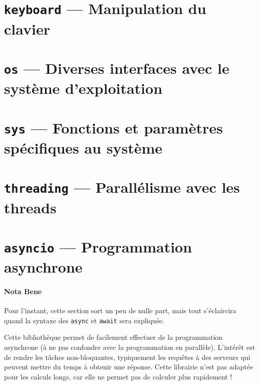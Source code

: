 \documentclass[a4paper, 10pt]{article}
\begin{document}
\section[{\footnotesize\texttt{keyboard}} --- Manipulation du clavier]{{\normalfont\bfseries\large\texttt{keyboard}} --- Manipulation du clavier}

\section[{\footnotesize\texttt{os}} --- Diverses interfaces avec le système d'exploitation]{{\normalfont\bfseries\large\texttt{os}} --- Diverses interfaces avec le système d'exploitation}

\section[{\footnotesize\texttt{sys}} --- Fonctions et paramètres spécifiques au système]{{\normalfont\bfseries\large\texttt{sys}} --- Fonctions et paramètres spécifiques au système}

\section[{\footnotesize\texttt{threading}} --- Parallélisme avec les threads]{{\normalfont\bfseries\large\texttt{threading}} --- Parallélisme avec les threads}

\section[{\footnotesize\texttt{asyncio}} --- Programmation asynchrone]{{\normalfont\bfseries\large\texttt{asyncio}} --- Programmation asynchrone}

\paragraph{Nota Bene} Pour l'instant, cette section sort un peu de nulle part, mais tout s'éclaircira quand la syntaxe des \texttt{async} et \texttt{await} sera expliquée.\medskip

Cette bibliothèque permet de facilement effectuer de la programmation asynchrone (à ne pas confondre avec la programmation en parallèle). L'intérêt est de rendre les tâches non-bloquantes, typiquement les requêtes à des serveurs qui peuvent mettre du temps à obtenir une réponse. Cette librairie n'est pas adaptée pour les calculs longs, car elle ne permet pas de calculer plus rapidement !\medskip
\end{document}
